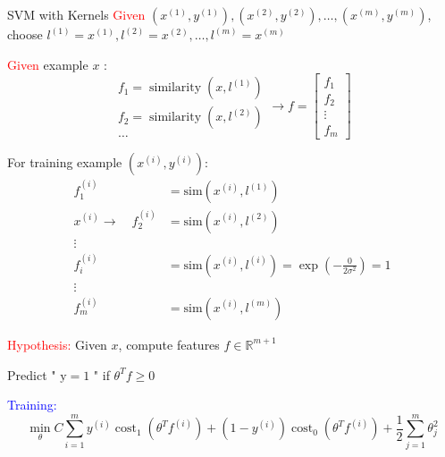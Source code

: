\documentclass[9pt,dvipsnames]{beamer}
\begin{document}
\begin{frame}{SVM with Kernels}
	\textcolor{red}{Given} \(\left(x^{(1)}, y^{(1)}\right),\left(x^{(2)}, y^{(2)}\right), \ldots,\left(x^{(m)}, y^{(m)}\right)\), choose \(l^{(1)}=x^{(1)}, l^{(2)}=x^{(2)}, \ldots, l^{(m)}=x^{(m)}\)
	
	\textcolor{red}{Given} example \(x\) :
	$$
	\begin{array}{l}f_{1}=\operatorname{similarity}\left(x, l^{(1)}\right) \\ f_{2}=\operatorname{similarity}\left(x, l^{(2)}\right) \\ \ldots\end{array} \rightarrow 
	f=\left[\begin{array}{c}f_{1} \\ f_{2} \\ \vdots \\ f_{m}\end{array}\right]
	$$
	\end{frame}
	
	\begin{frame}
		For training example \(\left(x^{(i)}, y^{(i)}\right)\):
		$$
		\begin{aligned} f_{1}^{(i)} & =\text{sim} \left(x^{(i)}, l^{(1)}\right) \\ x^{(i)} \rightarrow \quad f_{2}^{(i)} & =\text{sim} \left(x^{(i)}, l^{(2)}\right) \\ \vdots \\ f_{i}^{(i)}& =\text{sim} \left(x^{(i)}, l^{(i)}\right)=\exp \left(-\frac{0}{2\sigma^2}\right)=1 \\ \vdots & \\ f_{m}^{(i)} & =\text{sim} \left(x^{(i)}, l^{(m)}\right)\end{aligned}
		$$
\end{frame}
	
\begin{frame}
	\textcolor{red}{Hypothesis:} Given \(x\), compute features \(f \in \mathbb{R}^{m+1}\)
	
	Predict " \(\mathrm{y}=1\) " if \(\theta^{T} f \geq 0\)
	
	\textcolor{blue}{Training:}
	$$
	\min _{\theta} C \sum_{i=1}^{m} y^{(i)} \operatorname{cost}_{1}\left(\theta^{T} f^{(i)}\right)+\left(1-y^{(i)}\right) \operatorname{cost}_{0}\left(\theta^{T} f^{(i)}\right)+\frac{1}{2} \sum_{j=1}^{m} \theta_{j}^{2}
	$$
\end{frame}
\end{document}
